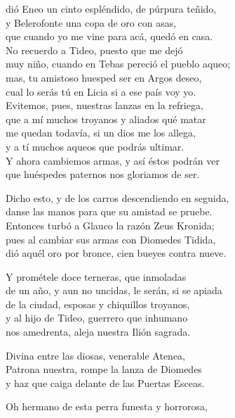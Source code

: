 dió Eneo un cinto espléndido, de púrpura teñido,\\
y Belerofonte una copa de oro con asas,\\
que cuando yo me vine para acá, quedó en casa.\\
No recuerdo a Tideo, puesto que me dejó\\
muy niño, cuando en Tebas pereció el pueblo aqueo;\\
mas, tu amistoso huesped ser en Argos deseo,\\
cual lo serás tú en Licia si a ese país voy yo.\\
Evitemos, pues, nuestras lanzas en la refriega,\\
que a mí muchos troyanos y aliados qué matar\\
me quedan todavía, si un dios me los allega,\\
y a tí muchos aqueos que podrás ultimar.\\
Y ahora cambiemos armas, y así éstos podrán ver\\
que huéspedes paternos nos gloriamos de ser.\par
\poend
\separator
%
\postart
{}
Dicho esto, y de los carros descendiendo en seguida,\\
danse las manos para que su amistad se pruebe.\\
Entonces turbó a Glauco la razón Zeus Kronida;\\
pues al cambiar sus armas con Diomedes Tidida,\\
dió aquél oro por bronce, cien bueyes contra nueve.\par
\poend
\separator
%
\postart
{}
Y prométele doce terneras, que inmoladas\\
de un año, y aun no uncidas, le serán, si se apiada\\
de la ciudad, esposas y chiquillos troyanos,\\
y al hijo de Tideo, guerrero que inhumano\\
nos amedrenta, aleja nuestra Ilión sagrada.\par
\poend
\separator
%
\postart
{}
Divina entre las diosas, venerable Atenea,\\
Patrona nuestra, rompe la lanza de Diomedes\\
y haz que caiga delante de las Puertas Esceas.\par
\poend
\separator
%
\postart
{}
Oh hermano de esta perra funesta y horrorosa,\\
